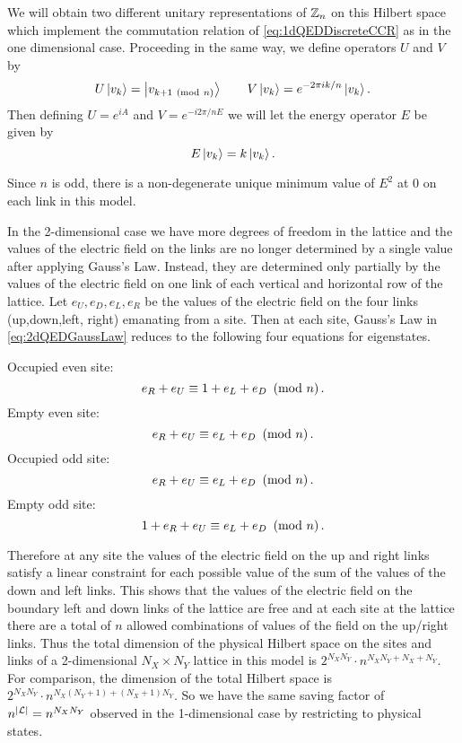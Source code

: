 \documentclass[10pt,reqno]{amsart}
\numberwithin{equation}{section}
\begin{document}
	We will obtain two different unitary representations of $\mathbb{Z}_n$ on this Hilbert space which implement the commutation relation of \cref{eq:1dQEDDiscreteCCR} as in the one dimensional case.
	Proceeding in the same way, we define operators $U$ and $V$ by
	\begin{equation}
		U\ket{v_k}=\ket{v_{k+1 \ \left(\mathrm{mod}\ n\right)}} \qquad V\ket{v_k}= e^{-2\pi i k/n} \ket{v_k}.
	\end{equation}
	Then defining $U=e^{iA}$ and $V=e^{-i2\pi/n E}$ we will let the energy operator $E$ be given by
	\begin{equation}
		E\ket{v_k}=k\ket{v_k}.
	\end{equation}
	
	Since $n$ is odd, there is a non-degenerate unique minimum value of $E^2$ at 0 on each link in this model.
	
	In the 2-dimensional case we have more degrees of freedom in the lattice and the values of the electric field on the links are no longer determined by a single value after applying Gauss's Law.
	Instead, they are determined only partially by the values of the electric field on one link of each vertical and horizontal row of the lattice. 
	Let $e_U,e_D,e_L,e_R$ be the values of the electric field on the four links (up,down,left, right) emanating from a site.
	Then at each site, Gauss's Law in \cref{eq:2dQEDGaussLaw} reduces to the following four equations for eigenstates.
	
	Occupied even site:
		\[ e_R+e_U \equiv 1+e_L+e_D \ \left(\mathrm{mod}\ n\right). \]
	Empty even site:
		\[ e_R+e_U \equiv e_L+e_D \ \left(\mathrm{mod}\ n\right). \]
	Occupied odd site:
		\[ e_R+e_U \equiv e_L+e_D \ \left(\mathrm{mod}\ n\right). \]
	Empty odd site:
		\[ 1+e_R+e_U \equiv e_L+e_D \ \left(\mathrm{mod}\ n\right). \]
	
	Therefore at any site the values of the electric field on the up and right links satisfy a linear constraint for each possible value of the sum of the values of the down and left links.
	This shows that the values of the electric field on the boundary left and down links of the lattice are free and at each site at the lattice there are a total of $n$ allowed combinations of values of the field on the up/right links.
	Thus the total dimension of the physical Hilbert space on the sites and links of a 2-dimensional $N_X\times N_Y$ lattice in this model is $2^{N_X N_Y} \cdot n^{N_X N_Y + N_X+ N_Y}$.
	For comparison, the dimension of the total Hilbert space is $2^{N_X N_Y} \cdot n^{N_X(N_Y+1)+(N_X+1)N_Y}$.
	So we have the same saving factor of $n^{|\mathcal{L}|}=n^{N_X N_Y}$ observed in the 1-dimensional case by restricting to physical states.\\
	
\end{document}
